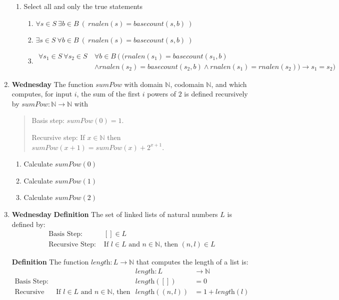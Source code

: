 \documentclass[12pt, oneside]{article}
\begin{document}
\begin{enumerate}
\begin{enumerate}
\item Select all and only the true statements
\begin{enumerate}
\item $\forall s \in S ~\exists b \in B ~\left(~rnalen(s) = basecount(s,b)~ \right)$
\item $\exists s \in S ~\forall b \in B ~\left(~rnalen(s) = basecount(s,b)~ \right)$
\item \begin{align*} \forall s_1 \in S~\forall s_2 \in S ~&\forall b \in B ~\big( ~\big( rnalen(s_1) = basecount(s_1,b) \\
&\land rnalen(s_2) = basecount(s_2,b) \land rnalen(s_1) = rnalen(s_2) \big) \to s_1 = s_2  \big)\end{align*}
\end{enumerate}

\end{enumerate}

\item {\bf Wednesday}  The function $sumPow$ with domain $\mathbb{N}$, codomain
$\mathbb{N}$, and which computes, for input $i$, the sum of the first $i$ powers of $2$ is defined
recursively by $sumPow: \mathbb{N} \to \mathbb{N}$ with

\begin{quote}
Basis step: $sumPow(0) = 1$.

Recursive step: If $x \in \mathbb{N}$ then $sumPow(x+1) = sumPow(x) + 2^{x+1}$.
\end{quote}

\begin{enumerate}
\item Calculate $sumPow(0)$
\item Calculate $sumPow(1)$
\item Calculate $sumPow(2)$
\end{enumerate}

\item  {\bf Wednesday} {\bf Definition} The set of linked lists of natural numbers $L$ is defined by:
\[
\begin{array}{ll}
    \textrm{Basis Step: } & [] \in L \\
    \textrm{Recursive Step: } & \textrm{If } l \in L\textrm{ and }n \in \mathbb{N} \textrm{, then } (n, l) \in L
\end{array}
\]

{\bf Definition} The function $\textit{length} : L \to \mathbb{N}$ that computes the length of a list is:
\[
\begin{array}{llll}
& & \textit{length} : L & \to \mathbb{N} \\
\textrm{Basis Step:} &  & \textit{length}([]) & = 0 \\
\textrm{Recursive Step:} & \textrm{If } l \in L\textrm{ and }n \in \mathbb{N}\textrm{, then  } & \textit{length}((n, l)) & = 1 + \textit{length}(l)
\end{array}
\]



\end{enumerate}
\end{document}
